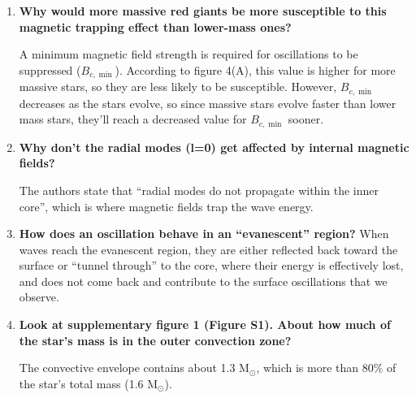 \documentclass[11pt]{article}
\begin{document}
\begin{enumerate}
    \item \textbf{Why would more massive red giants be more susceptible to this
        magnetic trapping effect than lower-mass ones?}

        A minimum magnetic field strength is required for oscillations to be
        suppressed ($B_{c,\min}$). According to figure 4(A),
        this value is higher for more massive stars, so they are less likely
        to be susceptible. However, $B_{c,\min}$ decreases as the stars
        evolve, so since massive stars evolve faster than lower mass stars,
        they'll reach a decreased value for $B_{c,\min}$ sooner.

    \item \textbf{Why don't the radial modes (l=0) get affected by internal
        magnetic fields?}

        The authors state that ``radial modes do not propagate within the inner core'',
        which is where magnetic fields trap the wave energy.

    \item \textbf{How does an oscillation behave in an ``evanescent'' region?}
        When waves reach the evanescent region, they are either reflected back
        toward the surface or ``tunnel through'' to the core, where their energy
        is effectively lost, and does not come back and contribute to the surface
        oscillations that we observe.

    \item \textbf{Look at supplementary figure 1 (Figure S1). About how much of the
        star's mass is in the outer convection zone?}

        The convective envelope contains about 1.3 M$_{\odot}$, which
        is more than 80\% of the star's total mass (1.6 M$_{\odot}$).

\end{enumerate}
\end{document}

